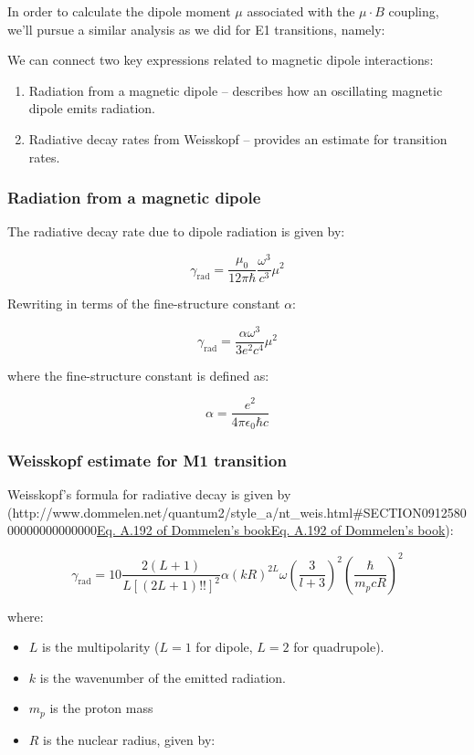 \documentclass[
]{article}
\let\oldhref\href
\renewcommand{\href}[2]{\ifx#1\urlprefix\oldhref{#1}{#2}\else\uline{\oldhref{#1}{#2}}\fi}
\renewcommand{\[}{\begin{equation}}
\renewcommand{\]}{\end{equation}}
\providecommand{\tightlist}{%
  \setlength{\itemsep}{0pt}\setlength{\parskip}{0pt}}
\begin{document}
In order to calculate the dipole moment \(\mu\) associated with the
\(\mu\cdot B\) coupling, we'll pursue a similar analysis as we did for
E1 transitions, namely:

We can connect two key expressions related to magnetic dipole
interactions:

\begin{enumerate}
\def\labelenumi{\arabic{enumi}.}
\tightlist
\item
  Radiation from a magnetic dipole -- describes how an oscillating
  magnetic dipole emits radiation.
\item
  Radiative decay rates from Weisskopf -- provides an estimate for
  transition rates.
\end{enumerate}

\subsubsection{Radiation from a magnetic
dipole}\label{radiation-from-a-magnetic-dipole}

The radiative decay rate due to dipole radiation is given by:

\[
\gamma_{\text{rad}} = \frac{\mu_0}{12 \pi \hbar} \frac{\omega^3}{c^3} \mu^2
\]

Rewriting in terms of the fine-structure constant \(\alpha\):

\[
\gamma_{\text{rad}} = \frac{\alpha \omega^3}{3 e^2 c^4} \mu^2
\]

where the fine-structure constant is defined as:

\[
\alpha = \frac{e^2}{4\pi \epsilon_0 \hbar c}
\]

\subsubsection{Weisskopf estimate for M1
transition}\label{weisskopf-estimate-for-m1-transition}

Weisskopf's formula for radiative decay is given by
(\href{http://www.dommelen.net/quantum2/style_a/nt_weis.html\#SECTION091258000000000000000}{Eq.
A.192 of Dommelen's book}):

\[
\gamma_{\text{rad}}  =  10\frac{2(L+1)}{L [(2L+1)!!]^2} \alpha (kR)^{2L} \omega \left( \frac{3}{l+3} \right)^2 \left( \frac{\hbar}{m_p c R} \right)^2
\]

where:

\begin{itemize}
\tightlist
\item
  \(L\) is the multipolarity (\(L=1\) for dipole, \(L=2\) for
  quadrupole).
\item
  \(k\) is the wavenumber of the emitted radiation.
\item
  \(m_p\) is the proton mass
\item
  \(R\) is the nuclear radius, given by:
\end{itemize}
\end{document}
